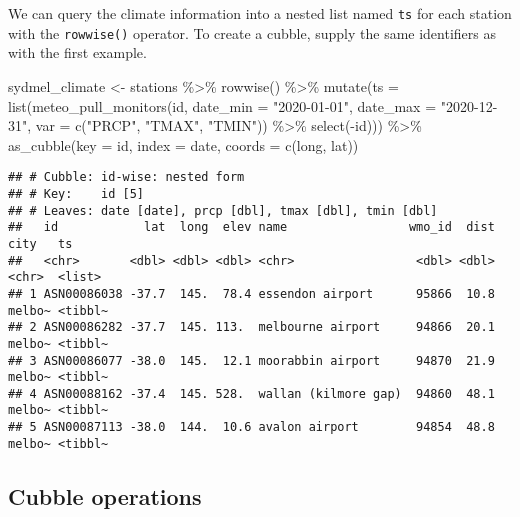 \documentclass{article}
\newenvironment{Shaded}{\begin{snugshade}}{\end{snugshade}}
\newcommand{\AttributeTok}[1]{\textcolor[rgb]{0.77,0.63,0.00}{#1}}
\newcommand{\FunctionTok}[1]{\textcolor[rgb]{0.00,0.00,0.00}{#1}}
\newcommand{\NormalTok}[1]{#1}
\newcommand{\OtherTok}[1]{\textcolor[rgb]{0.56,0.35,0.01}{#1}}
\newcommand{\SpecialCharTok}[1]{\textcolor[rgb]{0.00,0.00,0.00}{#1}}
\newcommand{\StringTok}[1]{\textcolor[rgb]{0.31,0.60,0.02}{#1}}
\begin{document}
We can query the climate information into a nested list named
\texttt{ts} for each station with the \texttt{rowwise()} operator. To
create a cubble, supply the same identifiers as with the first example.

\begin{Shaded}
\begin{Highlighting}[]
\NormalTok{sydmel\_climate }\OtherTok{\textless{}{-}}\NormalTok{ stations }\SpecialCharTok{\%\textgreater{}\%} 
  \FunctionTok{rowwise}\NormalTok{() }\SpecialCharTok{\%\textgreater{}\%} 
  \FunctionTok{mutate}\NormalTok{(}\AttributeTok{ts =} \FunctionTok{list}\NormalTok{(}\FunctionTok{meteo\_pull\_monitors}\NormalTok{(id, }
                                       \AttributeTok{date\_min =} \StringTok{"2020{-}01{-}01"}\NormalTok{, }
                                       \AttributeTok{date\_max =} \StringTok{"2020{-}12{-}31"}\NormalTok{,}
                                       \AttributeTok{var =} \FunctionTok{c}\NormalTok{(}\StringTok{"PRCP"}\NormalTok{, }\StringTok{"TMAX"}\NormalTok{, }\StringTok{"TMIN"}\NormalTok{)) }\SpecialCharTok{\%\textgreater{}\%} 
                     \FunctionTok{select}\NormalTok{(}\SpecialCharTok{{-}}\NormalTok{id))) }\SpecialCharTok{\%\textgreater{}\%} 
  \FunctionTok{as\_cubble}\NormalTok{(}\AttributeTok{key =}\NormalTok{ id, }\AttributeTok{index =}\NormalTok{ date, }\AttributeTok{coords =} \FunctionTok{c}\NormalTok{(long, lat))}
\end{Highlighting}
\end{Shaded}

\begin{verbatim}
## # Cubble: id-wise: nested form
## # Key:    id [5]
## # Leaves: date [date], prcp [dbl], tmax [dbl], tmin [dbl]
##   id            lat  long  elev name                 wmo_id  dist city   ts     
##   <chr>       <dbl> <dbl> <dbl> <chr>                 <dbl> <dbl> <chr>  <list> 
## 1 ASN00086038 -37.7  145.  78.4 essendon airport      95866  10.8 melbo~ <tibbl~
## 2 ASN00086282 -37.7  145. 113.  melbourne airport     94866  20.1 melbo~ <tibbl~
## 3 ASN00086077 -38.0  145.  12.1 moorabbin airport     94870  21.9 melbo~ <tibbl~
## 4 ASN00088162 -37.4  145. 528.  wallan (kilmore gap)  94860  48.1 melbo~ <tibbl~
## 5 ASN00087113 -38.0  144.  10.6 avalon airport        94854  48.8 melbo~ <tibbl~
\end{verbatim}

\newpage

\hypertarget{cubble-operations}{%
\subsection{Cubble operations}\label{cubble-operations}}
\end{document}
